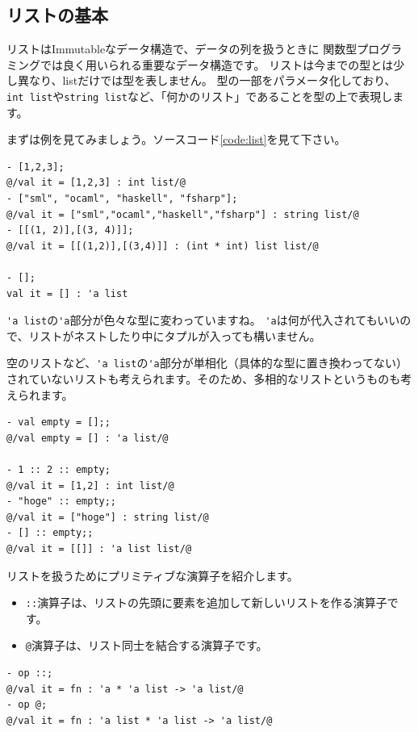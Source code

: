 \documentclass[11pt,a4paper]{article}
\begin{document}
\subsection{リストの基本}
リストはImmutableなデータ構造で、データの列を扱うときに
関数型プログラミングでは良く用いられる重要なデータ構造です。
リストは今までの型とは少し異なり、listだけでは型を表しません。
型の一部をパラメータ化しており、
\lstinline{int list}や\lstinline{string list}など、「何かのリスト」であることを型の上で表現します。

まずは例を見てみましょう。ソースコード\ref{code:list}を見て下さい。

\begin{lstlisting}[caption=色々なリスト,label=code:list]
- [1,2,3];
@/val it = [1,2,3] : int list/@
- ["sml", "ocaml", "haskell", "fsharp"];
@/val it = ["sml","ocaml","haskell","fsharp"] : string list/@
- [[(1, 2)],[(3, 4)]];
@/val it = [[(1,2)],[(3,4)]] : (int * int) list list/@

- [];
val it = [] : 'a list
\end{lstlisting}

\lstinline{'a list}の\lstinline{'a}部分が色々な型に変わっていますね。
\lstinline{'a}は何が代入されてもいいので、リストがネストしたり中にタプルが入っても構いません。

空のリストなど、\lstinline{'a list}の\lstinline{'a}部分が単相化（具体的な型に置き換わってない）
されていないリストも考えられます。そのため、多相的なリストというものも考えられます。

\begin{lstlisting}[caption=多相的なリスト,label=code:poly-list]
- val empty = [];;
@/val empty = [] : 'a list/@

- 1 :: 2 :: empty;
@/val it = [1,2] : int list/@
- "hoge" :: empty;;
@/val it = ["hoge"] : string list/@
- [] :: empty;;
@/val it = [[]] : 'a list list/@
\end{lstlisting}

リストを扱うためにプリミティブな演算子を紹介します。
\begin{itemize}
\item \lstinline{::}演算子は、リストの先頭に要素を追加して新しいリストを作る演算子です。
\item \lstinline{@}演算子は、リスト同士を結合する演算子です。
\end{itemize}

\begin{lstlisting}[caption=リスト操作演算子の型,label=code:list-operators]
- op ::;
@/val it = fn : 'a * 'a list -> 'a list/@
- op @;
@/val it = fn : 'a list * 'a list -> 'a list/@
\end{lstlisting}
\end{document}
